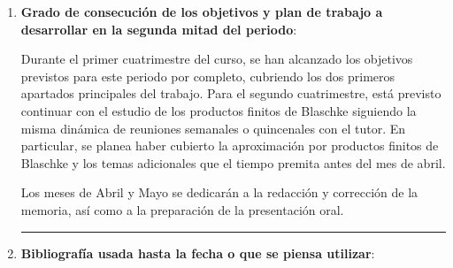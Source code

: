 \documentclass[a4paper,oneside,11pt,leqno]{article}
\begin{document}
\begin{enumerate}[label=\textbf{\arabic*.}]
\vskip 20pt
\hrule
\item {\bf Grado de consecuci\'on de los objetivos y plan de trabajo a desarrollar en la segunda mitad del periodo}: 

Durante el primer cuatrimestre del curso, se han alcanzado los objetivos previstos para este periodo por completo, cubriendo los dos primeros apartados principales del trabajo. Para el segundo cuatrimestre, est\'a previsto continuar con el estudio de los productos finitos de Blaschke siguiendo la misma din\'amica de reuniones semanales o quincenales con el tutor. En particular, se planea haber cubierto la aproximaci\'on por productos finitos de Blaschke y los temas adicionales que el tiempo premita antes del mes de abril.

Los meses de Abril y Mayo se dedicar\'an a la redacci\'on y correcci\'on de la memoria, as\'i como a la preparaci\'on de la presentaci\'on oral.

\vskip 20pt 
\hrule

\item {\bf Bibliograf\'ia usada hasta la fecha o que se piensa utilizar}: \\

\vspace{-15pt}

\nocite{daeppBeautyBlaschkeProducts2021}

\printbibliography[heading=none]





\end{enumerate}
\end{document}
